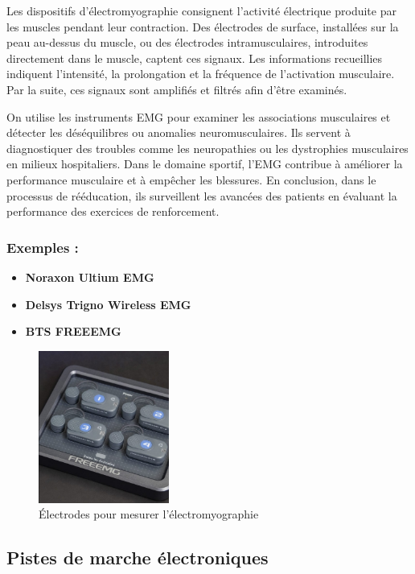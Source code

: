 Les dispositifs d'électromyographie consignent l'activité électrique produite par les muscles pendant leur contraction. 
Des électrodes de surface, installées sur la peau au-dessus du muscle, ou des électrodes intramusculaires, introduites directement dans le muscle, captent ces signaux. 
Les informations recueillies indiquent l'intensité, la prolongation et la fréquence de l'activation musculaire. 
Par la suite, ces signaux sont amplifiés et filtrés afin d'être examinés.

On utilise les instruments EMG pour examiner les associations musculaires et détecter les déséquilibres ou anomalies neuromusculaires. 
Ils servent à diagnostiquer des troubles comme les neuropathies ou les dystrophies musculaires en milieux hospitaliers. 
Dans le domaine sportif, l'EMG contribue à améliorer la performance musculaire et à empêcher les blessures. 
En conclusion, dans le processus de rééducation, ils surveillent les avancées des patients en évaluant la performance des exercices de renforcement.

\subsubsection{Exemples :}
\begin{itemize}
  \item \textbf{Noraxon Ultium EMG }
  \item \textbf{Delsys Trigno Wireless EMG }
  \item \textbf{BTS FREEEMG }
\end{itemize}

\begin{figure}[ht]
  \centering
  \includegraphics[height=5cm]{images/electrodes.png}
  \caption{Électrodes pour mesurer l'électromyographie}\label{fig:electrodes}
\end{figure}

\subsection{Pistes de marche électroniques}


